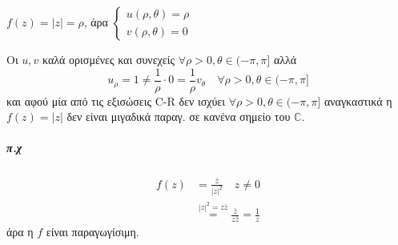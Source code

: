 \documentclass[12pt,a4paper,notitlepage,fleqn]{article}
\begin{document}
	 \( f(z)=|z|=\rho \), άρα \( \begin{cases}
	 u(\rho,\theta)=\rho \\ v(\rho,\theta)=0
	 \end{cases} \)

	 Οι \( u,v \) καλά ορισμένες και συνεχείς \( \forall \rho>0,
	 \theta\in (-\pi,\pi]
	  \) αλλά \[
	  u_\rho = 1 \neq \frac{1}{\rho}\cdot 0 =\frac{1}{\rho}v_\theta
	  \quad \forall \rho>0,\theta\in(-\pi,\pi]
	  \]
	  και αφού μία από τις εξισώσεις C-R δεν ισχύει \( \forall \rho>0,
	  \theta\in(-\pi,\pi]
	   \) αναγκαστικά η \( f(z)=|z| \) δεν είναι μιγαδικά παραγ. σε κανένα
	   σημείο του \( \mathbb C  \).
	\subparagraph{π.χ}
	\begin{align*}
	f(z) &= \frac{\bar z}{|z|^2} \quad z\neq0
	\\ &\overset{|z|^2=z\bar z}{=} \frac{\bar z}{z\bar z}=\frac{1}{z}
	\end{align*}
	άρα η \( f \) είναι παραγωγίσιμη.
\end{document}
